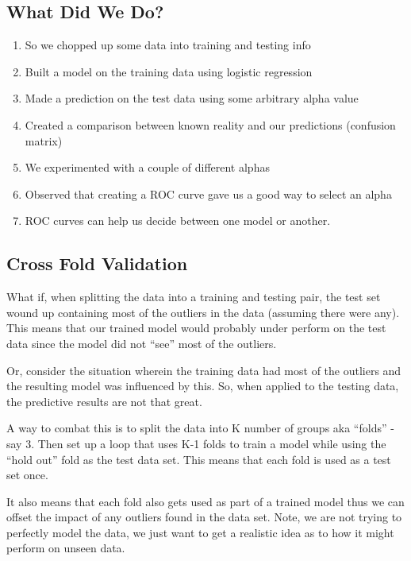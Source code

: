 \documentclass[
]{article}
\providecommand{\tightlist}{%
  \setlength{\itemsep}{0pt}\setlength{\parskip}{0pt}}
\begin{document}
\hypertarget{what-did-we-do}{%
\subsection{What Did We Do?}\label{what-did-we-do}}

\begin{enumerate}
\def\labelenumi{\arabic{enumi})}
\tightlist
\item
  So we chopped up some data into training and testing info
\item
  Built a model on the training data using logistic regression
\item
  Made a prediction on the test data using some arbitrary alpha value
\item
  Created a comparison between known reality and our predictions
  (confusion matrix)
\item
  We experimented with a couple of different alphas
\item
  Observed that creating a ROC curve gave us a good way to select an
  alpha
\item
  ROC curves can help us decide between one model or another.
\end{enumerate}

\hypertarget{cross-fold-validation}{%
\subsection{Cross Fold Validation}\label{cross-fold-validation}}

What if, when splitting the data into a training and testing pair, the
test set wound up containing most of the outliers in the data (assuming
there were any). This means that our trained model would probably under
perform on the test data since the model did not ``see'' most of the
outliers.

Or, consider the situation wherein the training data had most of the
outliers and the resulting model was influenced by this. So, when
applied to the testing data, the predictive results are not that great.

A way to combat this is to split the data into K number of groups aka
``folds'' - say 3. Then set up a loop that uses K-1 folds to train a
model while using the ``hold out'' fold as the test data set. This means
that each fold is used as a test set once.

It also means that each fold also gets used as part of a trained model
thus we can offset the impact of any outliers found in the data set.
Note, we are not trying to perfectly model the data, we just want to get
a realistic idea as to how it might perform on unseen data.
\end{document}
